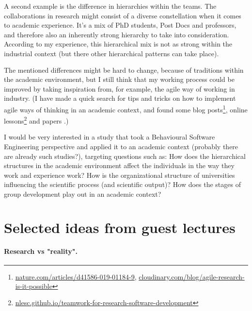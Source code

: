 \documentclass[11pt]{article}
\begin{document}
A second example is the difference in hierarchies within the teams. The collaborations in research might consist of a diverse constellation when it comes to academic experience. It's a mix of PhD students, Post Docs and professors, and therefore also an inherently strong hierarchy to take into consideration. 
According to my experience, this hierarchical mix is not as strong within the industrial context (but there other hierarchical patterns can take place).

The mentioned differences might be hard to change, because of traditions within the academic environment, but I still think that 
my working process could be improved by taking inspiration from, for example, the agile way of working in industry. (I have made a quick search for tips and tricks on how to implement agile ways of thinking in an academic context, and found some blog posts\footnote{\hyperlink{https://www.nature.com/articles/d41586-019-01184-9}{nature.com/articles/d41586-019-01184-9}, 
\hyperlink{https://cloudinary.com/blog/agile-research-is-it-possible}{cloudinary.com/blog/agile-research-is-it-possible}}, 
online lessons\footnote{\hyperlink{https://nlesc.github.io/teamwork-for-research-software-development/}{nlesc.github.io/teamwork-for-research-software-development}} 
and papers \cite{biely_agile_2024} \cite{senabre2018management}.)

I would be very interested in a study that took a Behavioural Software Engineering perspective and applied it to an academic context (probably there are already such studies?), targeting questions such as:
How does the hierarchical structures in the academic environment affect the individuals in the way they work and experience work? 
How is the organizational structure of universities influencing the scientific process (and scientific output)?
How does the stages of group development play out in an academic context? 



\section{Selected ideas from guest lectures}

\paragraph*{Research vs "reality".}
\end{document}
